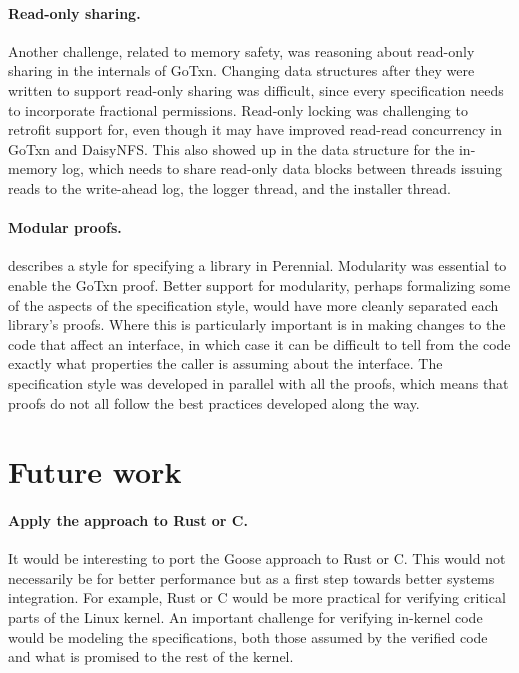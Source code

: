 \paragraph{Read-only sharing.}
Another challenge, related to memory safety, was reasoning about read-only
sharing in the internals of GoTxn. Changing data structures after they were written to support read-only
sharing was difficult, since every specification needs to incorporate fractional
permissions. Read-only locking was challenging to retrofit support for, even
though it may have improved read-read concurrency in GoTxn and DaisyNFS. This
also showed up in the data structure for the in-memory log, which needs to share
read-only data blocks between threads issuing reads to the write-ahead log, the logger
thread, and the installer thread.

\paragraph{Modular proofs.}
 describes a style for specifying a library in Perennial.
Modularity was essential to enable the GoTxn proof. Better support for
modularity, perhaps formalizing some of the aspects of the specification style,
would have more cleanly separated each library's proofs. Where this is
particularly important is in making changes to the code that affect an
interface, in which case it can be difficult to tell from the code exactly what
properties the caller is assuming about the interface. The specification style
was developed in parallel with all the proofs, which means that proofs do not
all follow the best practices developed along the way.

\section{Future work}

\paragraph{Apply the approach to Rust or C.} It would be interesting to port
the Goose approach to Rust or C. This would not necessarily be for better
performance but as a first step towards better systems integration. For example,
Rust or C would be more practical for verifying critical parts of the Linux
kernel. An important challenge for verifying in-kernel code would be modeling
the specifications, both those assumed by the verified code and what is promised
to the rest of the kernel.

